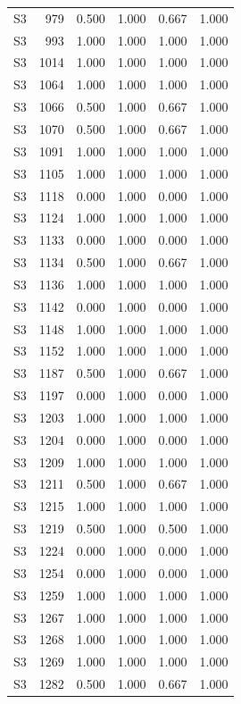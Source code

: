 \begin{tabular}{lrrrrr}
S3 & 979 & 0.500 & 1.000 & 0.667 & 1.000 \\
S3 & 993 & 1.000 & 1.000 & 1.000 & 1.000 \\
S3 & 1014 & 1.000 & 1.000 & 1.000 & 1.000 \\
S3 & 1064 & 1.000 & 1.000 & 1.000 & 1.000 \\
S3 & 1066 & 0.500 & 1.000 & 0.667 & 1.000 \\
S3 & 1070 & 0.500 & 1.000 & 0.667 & 1.000 \\
S3 & 1091 & 1.000 & 1.000 & 1.000 & 1.000 \\
S3 & 1105 & 1.000 & 1.000 & 1.000 & 1.000 \\
S3 & 1118 & 0.000 & 1.000 & 0.000 & 1.000 \\
S3 & 1124 & 1.000 & 1.000 & 1.000 & 1.000 \\
S3 & 1133 & 0.000 & 1.000 & 0.000 & 1.000 \\
S3 & 1134 & 0.500 & 1.000 & 0.667 & 1.000 \\
S3 & 1136 & 1.000 & 1.000 & 1.000 & 1.000 \\
S3 & 1142 & 0.000 & 1.000 & 0.000 & 1.000 \\
S3 & 1148 & 1.000 & 1.000 & 1.000 & 1.000 \\
S3 & 1152 & 1.000 & 1.000 & 1.000 & 1.000 \\
S3 & 1187 & 0.500 & 1.000 & 0.667 & 1.000 \\
S3 & 1197 & 0.000 & 1.000 & 0.000 & 1.000 \\
S3 & 1203 & 1.000 & 1.000 & 1.000 & 1.000 \\
S3 & 1204 & 0.000 & 1.000 & 0.000 & 1.000 \\
S3 & 1209 & 1.000 & 1.000 & 1.000 & 1.000 \\
S3 & 1211 & 0.500 & 1.000 & 0.667 & 1.000 \\
S3 & 1215 & 1.000 & 1.000 & 1.000 & 1.000 \\
S3 & 1219 & 0.500 & 1.000 & 0.500 & 1.000 \\
S3 & 1224 & 0.000 & 1.000 & 0.000 & 1.000 \\
S3 & 1254 & 0.000 & 1.000 & 0.000 & 1.000 \\
S3 & 1259 & 1.000 & 1.000 & 1.000 & 1.000 \\
S3 & 1267 & 1.000 & 1.000 & 1.000 & 1.000 \\
S3 & 1268 & 1.000 & 1.000 & 1.000 & 1.000 \\
S3 & 1269 & 1.000 & 1.000 & 1.000 & 1.000 \\
S3 & 1282 & 0.500 & 1.000 & 0.667 & 1.000 \\

\end{tabular}
